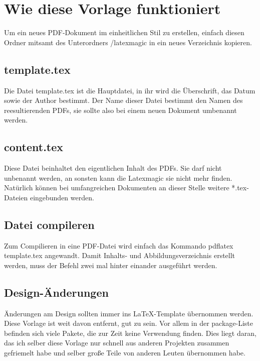 \section{Wie diese Vorlage funktioniert}
\label{sec:vorlage-funktioniert}

Um ein neues PDF-Dokument im einheitlichen Stil zu erstellen, einfach diesen
Ordner mitsamt des Unterordners /latexmagic in ein neues Verzeichnis kopieren.

\subsection{template.tex}
\label{sec:template-tex}
Die Datei template.tex ist die Hauptdatei, in ihr wird die Überschrift, das
Datum sowie der Author bestimmt. Der Name dieser Datei bestimmt den Namen des
reesultierenden PDFs, sie sollte also bei einem neuen Dokument umbenannt werden.

\subsection{content.tex}
\label{sec:content-tex}
Diese Datei beinhaltet den eigentlichen Inhalt des PDFs. Sie darf nicht
unbenannt werden, an sonsten kann die Latexmagic sie nicht mehr finden. 
Natürlich können bei umfangreichen Dokumenten an dieser Stelle weitere
*.tex-Dateien eingebunden werden.

\subsection{Datei compileren}
\label{sec:datei-compilieren}
Zum Compilieren in eine PDF-Datei wird einfach das Kommando pdflatex
template.tex angewandt. Damit Inhalts- und Abbildungsverzeichnis erstellt
werden, muss der Befehl zwei mal hinter einander ausgeführt werden.

\subsection{Design-Änderungen}
\label{sec:design-changes}
Änderungen am Design sollten immer ins LaTeX-Template übernommen werden. Diese
Vorlage ist weit davon entfernt, gut zu sein. Vor allem in der package-Liste
befinden sich viele Pakete, die zur Zeit keine Verwendung finden. Dies liegt
daran, das ich selber diese Vorlage nur schnell aus anderen Projekten zusammen
gefriemelt habe und selber große Teile von anderen Leuten übernommen habe.
